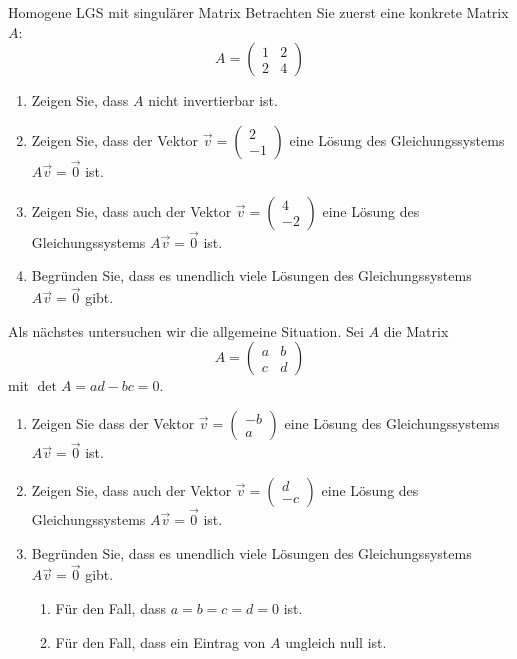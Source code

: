 \begin{LA}{Homogene LGS mit singulärer Matrix}{}
    Betrachten Sie zuerst eine konkrete Matrix $A$:
    \[
    A = \begin{pmatrix} 1 & 2 \\ 2 & 4 \end{pmatrix}
    \]
    \begin{enumerate}
        \item Zeigen Sie, dass $A$ nicht invertierbar ist.
        \item Zeigen Sie, dass der Vektor $\vec{v} = \begin{pmatrix}
            2 \\ -1
        \end{pmatrix}$ eine Lösung des Gleichungssystems
        $
        A\vec{v} = \vec{0}
        $
        ist.
        \item Zeigen Sie, dass auch der Vektor $\vec{v} = \begin{pmatrix}
            4 \\ -2
        \end{pmatrix}$ eine Lösung des Gleichungssystems
        $
        A\vec{v} = \vec{0}
        $
        ist.
        \item Begründen Sie, dass es unendlich viele Lösungen des Gleichungssystems
        $
        A\vec{v} = \vec{0}
        $
        gibt.
    \end{enumerate}
    Als nächstes untersuchen wir die allgemeine Situation. Sei $A$ die Matrix
    $$ A = \begin{pmatrix} a & b \\ c & d \end{pmatrix}$$
    mit $\det A = ad - bc = 0$.
    \begin{enumerate}[resume]
        \item Zeigen Sie dass der Vektor $\vec{v} = \begin{pmatrix}
            -b \\ a
        \end{pmatrix}$ eine Lösung des Gleichungssystems
        $
        A\vec{v} = \vec{0}
        $
        ist.
        \item Zeigen Sie, dass auch der Vektor $\vec{v} = \begin{pmatrix}
            d \\ -c
        \end{pmatrix}$ eine Lösung des Gleichungssystems
        $
        A\vec{v} = \vec{0}
        $
        ist.
        \item Begründen Sie, dass es unendlich viele Lösungen des Gleichungssystems
        $
        A\vec{v} = \vec{0}
        $
        gibt.
        \begin{enumerate}
            \item Für den Fall, dass $a=b=c=d=0$ ist.
            \item Für den Fall, dass ein Eintrag von $A$ ungleich null ist.
                \end{enumerate}
    \end{enumerate}
\end{LA}
